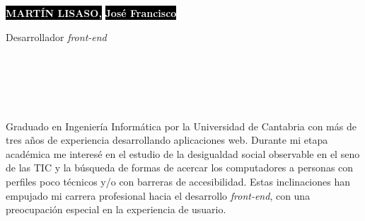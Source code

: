 \documentclass[9pt]{developercv} %
\begin{document}
%
%

\begin{minipage}[t]{0.6\textwidth}
	\vspace{-\baselineskip} %

	\colorbox{black}{{\HUGE\textcolor{white}{\textbf{\MakeUppercase{Martín Lisaso,}}}}}
	\colorbox{black}{{\HUGE\textcolor{white}{\textbf{José Francisco}}}}

	\vspace{6pt}

	{\huge Desarrollador \emph{front-end}}
\end{minipage}
\hfill
\begin{minipage}[t]{0.3\textwidth}
	\vspace{-\baselineskip} %

	\\
	\\
	\\
	\\
\end{minipage}

\vspace{0.5cm}

%
%


\begin{minipage}[t]{0.45\textwidth} %
	\vspace{-\baselineskip} %
	
	Graduado en Ingeniería Informática por la Universidad de Cantabria con más de tres años de experiencia desarrollando aplicaciones web. Durante mi etapa académica me interesé en el estudio de la desigualdad social observable en el seno de las TIC y la búsqueda de formas de acercar los computadores a personas con perfiles poco técnicos y/o con barreras de accesibilidad. Estas inclinaciones han empujado mi carrera profesional hacia el desarrollo \emph{front-end}, con una preocupación especial en la experiencia de usuario.\\
\end{minipage}
\hfill %
\begin{minipage}[t]{0.5\textwidth} %
	\vspace{-\baselineskip} %
	\begin{barchart}{5.5}
	\end{barchart}
\end{minipage}
\end{document}
